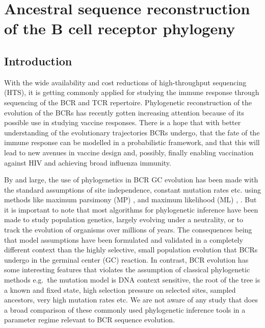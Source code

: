 \chapter{Ancestral sequence reconstruction of the B cell receptor phylogeny}

\section{Introduction}
With the wide availability and cost reductions of high-throughput sequencing (HTS), it is getting commonly applied for studying the immune response through sequencing of the BCR and TCR repertoire.
Phylogenetic reconstruction of the evolution of the BCRs has recently gotten increasing attention because of its possible use in studying vaccine responses.
There is a hope that with better understanding of the evolutionary trajectories BCRs undergo, that the fate of the immune response can be modelled in a probabilistic framework, and that this will lead to new avenues in vaccine design and, possibly, finally enabling vaccination against HIV and achieving broad influenza immunity.

By and large, the use of phylogenetics in BCR GC evolution has been made with the standard assumptions of site independence, constant mutation rates etc. using methods like maximum parsimony (MP) \cite{tas2016visualizing}, \cite{Barak2008-fw} and maximum likelihood (ML) \cite{Doria-Rose2014-vi}, \cite{Hoehn2016-wg}.
But it is important to note that most algorithms for phylogenetic inference have been made to study population genetics, largely evolving under a neutrality, or to track the evolution of organisms over millions of years.
The consequences being that model assumptions have been formulated and validated in a completely different context than the highly selective, small population evolution that BCRs undergo in the germinal center (GC) reaction.
In contrast, BCR evolution has some interesting features that violates the assumption of classical phylogenetic methods e.g.\ the mutation model is DNA context sensitive, the root of the tree is a known and fixed state, high selection pressure on selected sites, sampled ancestors, very high mutation rates etc.
We are not aware of any study that does a broad comparison of these commonly used phylogenetic inference tools in a parameter regime relevant to BCR sequence evolution.

